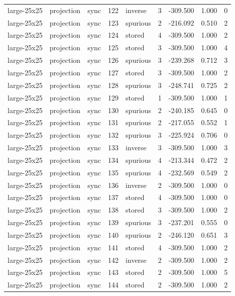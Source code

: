 \begin{tabular}{lllrlrrrr}
large-25x25 & projection & sync & 122 & inverse & 3 & -309.500 & 1.000 & 0 \\
large-25x25 & projection & sync & 123 & spurious & 2 & -216.092 & 0.510 & 2 \\
large-25x25 & projection & sync & 124 & stored & 4 & -309.500 & 1.000 & 2 \\
large-25x25 & projection & sync & 125 & stored & 3 & -309.500 & 1.000 & 4 \\
large-25x25 & projection & sync & 126 & spurious & 3 & -239.268 & 0.712 & 3 \\
large-25x25 & projection & sync & 127 & stored & 3 & -309.500 & 1.000 & 2 \\
large-25x25 & projection & sync & 128 & spurious & 3 & -248.741 & 0.725 & 2 \\
large-25x25 & projection & sync & 129 & stored & 1 & -309.500 & 1.000 & 1 \\
large-25x25 & projection & sync & 130 & spurious & 2 & -240.185 & 0.645 & 0 \\
large-25x25 & projection & sync & 131 & spurious & 2 & -217.055 & 0.552 & 1 \\
large-25x25 & projection & sync & 132 & spurious & 3 & -225.924 & 0.706 & 0 \\
large-25x25 & projection & sync & 133 & inverse & 3 & -309.500 & 1.000 & 3 \\
large-25x25 & projection & sync & 134 & spurious & 4 & -213.344 & 0.472 & 2 \\
large-25x25 & projection & sync & 135 & spurious & 4 & -232.569 & 0.549 & 2 \\
large-25x25 & projection & sync & 136 & inverse & 2 & -309.500 & 1.000 & 0 \\
large-25x25 & projection & sync & 137 & stored & 4 & -309.500 & 1.000 & 0 \\
large-25x25 & projection & sync & 138 & stored & 3 & -309.500 & 1.000 & 2 \\
large-25x25 & projection & sync & 139 & spurious & 3 & -237.201 & 0.555 & 0 \\
large-25x25 & projection & sync & 140 & spurious & 2 & -246.120 & 0.651 & 3 \\
large-25x25 & projection & sync & 141 & stored & 4 & -309.500 & 1.000 & 2 \\
large-25x25 & projection & sync & 142 & inverse & 2 & -309.500 & 1.000 & 2 \\
large-25x25 & projection & sync & 143 & stored & 2 & -309.500 & 1.000 & 5 \\
large-25x25 & projection & sync & 144 & stored & 2 & -309.500 & 1.000 & 2 \\

\end{tabular}
